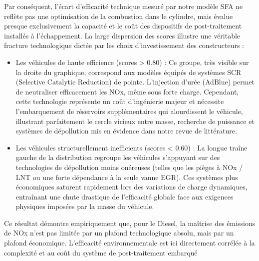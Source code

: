 \vspace{0.6em}

Par conséquent, l'écart d'efficacité technique mesuré par notre modèle SFA ne reflète pas une optimisation de la combustion dans le cylindre, mais évalue presque exclusivement la capacité et le coût des dispositifs de post-traitement installés à l'échappement. La large dispersion des scores illustre une véritable fracture technologique dictée par les choix d'investissement des constructeurs :

\vspace{0.6em}

\begin{itemize}
    \item Les véhicules de haute efficience (scores > 0.80) : Ce groupe, très visible sur la droite du graphique, correspond aux modèles équipés de systèmes SCR (Selective Catalytic Reduction) de pointe. L'injection d'urée (AdBlue) permet de neutraliser efficacement les NOx, même sous forte charge. Cependant, cette technologie représente un coût d'ingénierie majeur et nécessite l'embarquement de réservoirs supplémentaires qui alourdissent le véhicule, illustrant parfaitement le cercle vicieux entre masse, recherche de puissance et systèmes de dépollution mis en évidence dans notre revue de littérature.
\end{itemize}

\vspace{0.6em}

\begin{itemize}
    \item Les véhicules structurellement inefficients (scores < 0.60) : La longue traîne gauche de la distribution regroupe les véhicules s'appuyant sur des technologies de dépollution moins onéreuses (telles que les pièges à NOx / LNT ou une forte dépendance à la seule vanne EGR). Ces systèmes plus économiques saturent rapidement lors des variations de charge dynamiques, entraînant une chute drastique de l'efficacité globale face aux exigences physiques imposées par la masse du véhicule.
\end{itemize}

\vspace{0.6em}

Ce résultat démontre empiriquement que, pour le Diesel, la maîtrise des émissions de NOx n'est pas limitée par un plafond technologique absolu, mais par un plafond économique. L'efficacité environnementale est ici directement corrélée à la complexité et au coût du système de post-traitement embarqué

